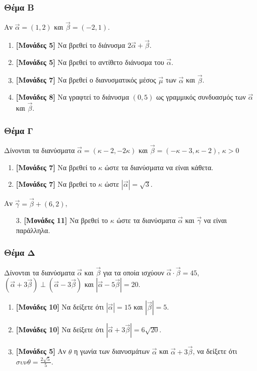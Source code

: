 \documentclass[12pt]{article}
\begin{document}
\section*{Θέμα Β}
  \noindent
  Αν $\vec{α}=(1,2)$ και $\vec{β}=(-2,1)$.
  \begin{enumerate}
    \item \textbf{[Μονάδες 5]} Να βρεθεί το διάνυσμα $2\vec{α}+\vec{β}$.
    \item \textbf{[Μονάδες 5]} Να βρεθεί το αντίθετο διάνυσμα του $\vec{α}$.
    \item \textbf{[Μονάδες 7]} Να βρεθεί ο διανυσματικός μέσος $\vec{μ}$ των $\vec{α}$ και $\vec{β}$.
    \item \textbf{[Μονάδες 8]} Να γραφτεί το διάνυσμα $(0,5)$ ως γραμμικός συνδυασμός των $\vec{α}$ και $\vec{β}$.
  \end{enumerate}

\section*{Θέμα Γ}
  \noindent
  Δίνονται τα διανύσματα $\vec{α}=(κ-2,-2κ)$ και $\vec{β}=(-κ-3,κ-2)$, $κ>0$
  \begin{enumerate}
    \item \textbf{[Μονάδες 7]} Να βρεθεί το $κ$ ώστε τα διανύσματα να είναι κάθετα.
    \item \textbf{[Μονάδες 7]} Να βρεθεί το $κ$ ώστε $|\vec{α}|=\sqrt{3}$.
  \end{enumerate}
  Αν $\vec{γ}=\vec{β}+(6,2)$,
  \begin{enumerate}
    \item[3.] \textbf{[Μονάδες 11]} Να βρεθεί το $κ$ ώστε τα διανύσματα $\vec{α}$ και $\vec{γ}$ να είναι παράλληλα.
  \end{enumerate}

\section*{Θέμα Δ}
  \noindent
  Δίνονται τα διανύσματα $\vec{α}$ και $\vec{β}$ για τα οποία ισχύουν $\vec{α}\cdot\vec{β}=45$, $\left(\vec{α}+3\vec{β}\right)\perp\left(\vec{α}-3\vec{β}\right)$ και $|\vec{α}-5\vec{β}|=20$.
  \begin{enumerate}
    \item \textbf{[Μονάδες 10]} Να δείξετε ότι $|\vec{α}|=15$ και $|\vec{β}|=5$.
    \item \textbf{[Μονάδες 10]} Να δείξετε ότι $|\vec{α}+3\vec{β}|=6\sqrt{20}$.
    \item \textbf{[Μονάδες 5]} Αν $θ$ η γωνία των διανυσμάτων $\vec{α}$ και $\vec{α}+3\vec{β}$, να δείξετε ότι $συνθ=\frac{2\sqrt{5}}{5}$.
  \end{enumerate}

\vspace{3\baselineskip}

\part*{}
\end{document}
